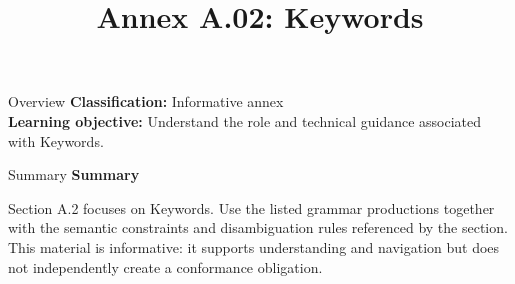 \documentclass[10pt,letterpaper]{article}
\title{Annex A.02: Keywords}
\author{}
\date{}
\begin{document}
\maketitle
\begin{CornellOverviewBox}{Overview}
\textbf{Classification:} Informative annex\\[2pt]
\textbf{Learning objective:} Understand the role and technical guidance associated with Keywords.
\end{CornellOverviewBox}\begin{CornellSummaryBox}{Summary}
{\sffamily\bfseries\color{Accent} Summary}\par\vspace{3pt}Section A.2 focuses on Keywords. Use the listed grammar productions together with the semantic constraints and disambiguation rules referenced by the section. This material is informative: it supports understanding and navigation but does not independently create a conformance obligation.
\end{CornellSummaryBox}
\end{document}
